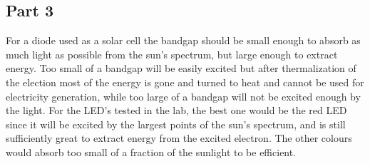 \subsection{Part 3}
For a diode used as a solar cell the bandgap should be small enough to absorb as much light as possible from the sun's spectrum, but large enough to extract energy. Too small of a bandgap will be easily excited but after thermalization of the election most of the energy is gone and turned to heat and cannot be used for electricity generation, while too large of a bandgap will not be excited enough by the light. For the LED's tested in the lab, the best one would be the red LED since it will be excited by the largest points of the sun's spectrum, and is still sufficiently great to extract energy from the excited electron. The other colours would absorb too small of a fraction of the sunlight to be efficient. 
